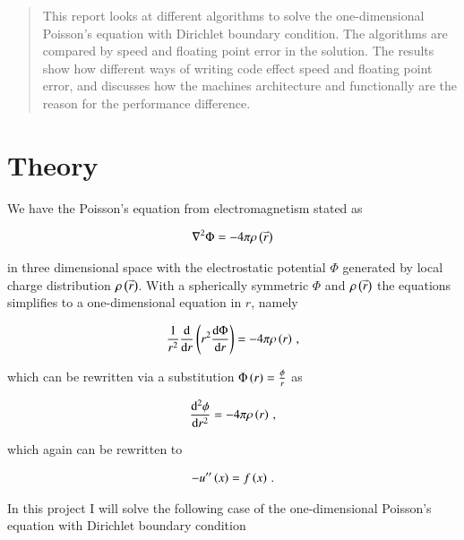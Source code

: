 \documentclass[11pt,english,a4paper]{article}
\begin{document}
\maketitle
\begin{flushleft}

\begin{abstract}
This report looks at different algorithms to solve the one-dimensional Poisson's equation with Dirichlet boundary condition. The algorithms are compared by speed and floating point error in the solution. The results show how different ways of writing code effect speed and floating point error, and discusses how the machines architecture and functionally are the reason for the performance difference.
\end{abstract}

\section{Theory}

We have the Poisson's equation from electromagnetism stated as

\begin{align*}
\nabla^2 \Phi = - 4 \pi \rho\left({\accentset{\rightarrow}{r}}\right)
\end{align*}

in three dimensional space with the electrostatic potential $\Phi$ generated by local charge distribution $\rho\left({\accentset{\rightarrow}{r}}\right)$. With a spherically symmetric $\Phi$ and $\rho\left({\accentset{\rightarrow}{r}}\right)$ the equations simplifies to a one-dimensional equation in $r$, namely

\begin{align*}
\frac{1}{r^2}\frac{\mathrm{d}}{\mathrm{d}r}\left({r^2\frac{\mathrm{d}\Phi}{\mathrm{d}r}}\right) = -4 \pi \rho\left({r}\right) \,,
\end{align*}

which can be rewritten via a substitution $\Phi\left({r}\right) = \frac{\phi}{r}$ as 

\begin{align*}
\frac{\mathrm{d}^2\phi}{\mathrm{d}r^2} = - 4\pi \rho\left({r}\right) \,,
\end{align*}

which again can be rewritten to

\begin{align*}
-u^{\prime\prime}\left({x}\right) = f\left({x}\right) \,.
\end{align*}

In this project I will solve the following case of the one-dimensional Poisson's equation with Dirichlet boundary condition


\end{flushleft}
\end{document}

